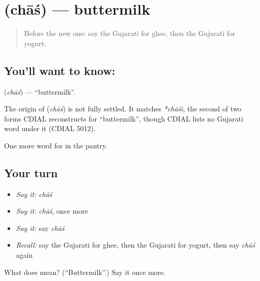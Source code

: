\section[\texorpdfstring{\gu{છાશ} (chāś)}{છાશ (chāś)}]{ (chāś) — buttermilk}

\label{lesson:GU-C58-buttermilk}



\begin{quote}
Before the new one: say the Gujarati for ghee, then the Gujarati for yogurt.
\end{quote}

\subsection*{You'll want to know: }
\textbf{} (\emph{chāś}) — \textquotedblleft{}buttermilk\textquotedblright{}.

\begin{cousinweb}
The origin of \textbf{} (\emph{chāś}) is not fully settled. It matches \emph{*chāśī}, the second of two forms CDIAL reconstructs for \textquotedblleft{}buttermilk\textquotedblright{}, though CDIAL lists no Gujarati word under it (CDIAL 5012).
\end{cousinweb}

\begin{grammarlens}[title={What you've built}]
One more word for in the pantry.
\end{grammarlens}

\subsection*{Your turn}
\begin{itemize}
\raggedright
  \item \emph{Say it:} \emph{chāś}
  \item \emph{Say it:} \emph{chāś}, once more
  \item \emph{Say it:} say \emph{chāś}
  \item \emph{Recall:} say the Gujarati for ghee, then the Gujarati for yogurt, then say \emph{chāś} again
\end{itemize}

\begin{tcolorbox}[breakable,colback=teal!4,colframe=teal!35!black,title={Before you move on}]
What does  mean? (\textquotedblleft{}Buttermilk\textquotedblright{}.) Say it once more.
\end{tcolorbox}
